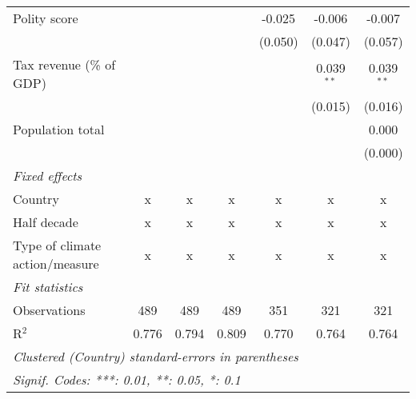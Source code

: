 \begin{tabular}{lcccccc}
   Polity score                                                           &         &                &                & -0.025         & -0.006         & -0.007\\   
                                                                          &         &                &                & (0.050)        & (0.047)        & (0.057)\\   
   Tax revenue (\% of GDP)                                                &         &                &                &                & 0.039$^{**}$   & 0.039$^{**}$\\   
                                                                          &         &                &                &                & (0.015)        & (0.016)\\   
   Population total                                                       &         &                &                &                &                & 0.000\\   
                                                                          &         &                &                &                &                & (0.000)\\   
   \emph{Fixed effects}\\
   Country                                                                & x       & x              & x              & x              & x              & x\\  
   Half decade                                                            & x       & x              & x              & x              & x              & x\\  
   Type of climate action/measure                                         & x       & x              & x              & x              & x              & x\\  
   \midrule \emph{Fit statistics}\\
   Observations                                                           & 489     & 489            & 489            & 351            & 321            & 321\\  
   R$^2$                                                                  & 0.776   & 0.794          & 0.809          & 0.770          & 0.764          & 0.764\\  
   \midrule
   \multicolumn{7}{l}{\emph{Clustered (Country) standard-errors in parentheses}}\\
   \multicolumn{7}{l}{\emph{Signif. Codes: ***: 0.01, **: 0.05, *: 0.1}}\\
\end{tabular}
\par\endgroup


